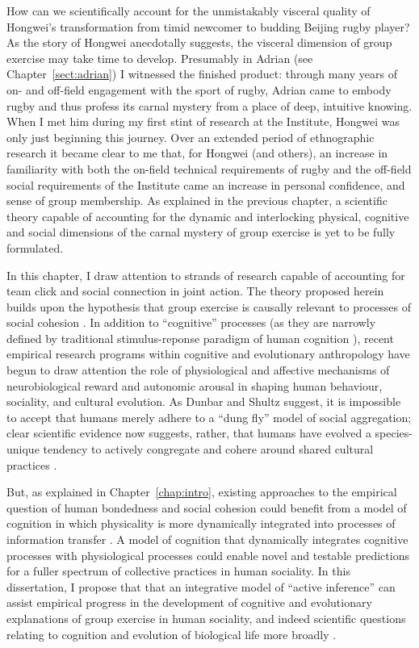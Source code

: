 \begin{CJK}{UTF8}{gbsn}
How can we scientifically account for the unmistakably visceral quality of Hongwei's transformation from timid newcomer to budding Beijing rugby player?  As the story of Hongwei anecdotally suggests, the visceral dimension of group exercise may take time to develop.  Presumably in Adrian (see Chapter~\ref{sect:adrian}) I witnessed the finished product: through many years of on- and off-field engagement with the sport of rugby, Adrian came to embody rugby and thus profess its carnal mystery from a place of deep, intuitive knowing.  When I met him during my first stint of research at the Institute, Hongwei was only just beginning this journey.  Over an extended period of ethnographic research it became clear to me that, for Hongwei (and others), an increase in familiarity with both the on-field technical requirements of rugby and the off-field social requirements of the Institute came an increase in personal confidence, and sense of group membership.  As explained in the previous chapter, a scientific theory capable of accounting for the dynamic and interlocking physical, cognitive and social dimensions of the carnal mystery of group exercise is yet to be fully formulated.

In this chapter, I draw attention to strands of research capable of accounting for team click and social connection in joint action.  The theory proposed herein builds upon the hypothesis that group exercise is causally relevant to processes of social cohesion \citep{Dunbar2010,Whitehouse2014,Cohen2017}. In addition to ``cognitive'' processes (as they are narrowly defined by traditional stimulus-reponse paradigm of human cognition \citep[e.g.][]{Marr1985}), recent empirical research programs within cognitive and evolutionary anthropology have begun to draw attention the role of physiological and affective mechanisms of neurobiological reward and autonomic arousal in shaping human behaviour, sociality, and cultural evolution.  As Dunbar and Shultz suggest, it is impossible to accept that humans merely adhere to a ``dung fly'' model of social aggregation; clear scientific evidence now suggests, rather, that humans have evolved a species-unique tendency to actively congregate and cohere around shared cultural practices \citep[see][]{Tomasello2005}.

But, as explained in Chapter~\ref{chap:intro}, existing approaches to the empirical question of human bondedness and social cohesion could benefit from a model of cognition in which physicality is more dynamically integrated into processes of information transfer \citep{Yufik2017}.  A model of cognition that dynamically integrates cognitive processes with physiological processes could enable novel and testable predictions for a fuller spectrum of collective practices in human sociality.  In this dissertation, I propose that that an integrative model of ``active inference'' \citep{Friston2010} can assist empirical progress in the development of cognitive and evolutionary explanations of group exercise in human sociality, and indeed scientific questions relating to cognition and evolution of biological life more broadly \citep{Ramstead2017}.



\end{CJK}
